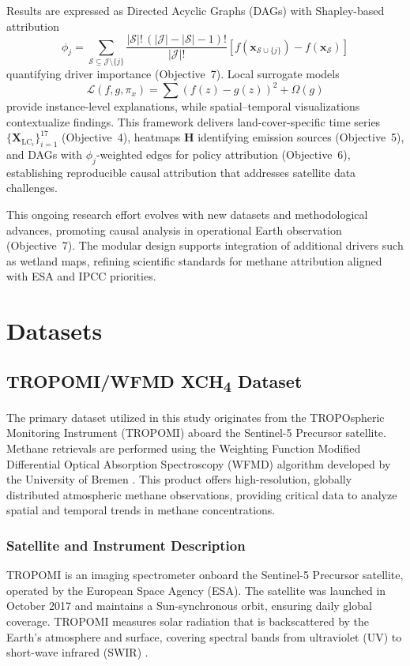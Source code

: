 Results are expressed as Directed Acyclic Graphs (DAGs) with Shapley-based attribution  
\[
\phi_j = \sum_{\mathcal{S} \subseteq \mathcal{J} \setminus \{j\}}
\frac{|\mathcal{S}|! \,(|\mathcal{J}| - |\mathcal{S}| - 1)!}{|\mathcal{J}|!}
\left[ f(\mathbf{x}_{\mathcal{S} \cup \{j\}}) - f(\mathbf{x}_{\mathcal{S}}) \right]
\]  
quantifying driver importance (Objective~7). Local surrogate models  
\[
\mathcal{L}(f,g,\pi_x) = \sum (f(z) - g(z))^2 + \Omega(g)
\]  
provide instance-level explanations, while spatial–temporal visualizations contextualize findings. This framework delivers land-cover-specific time series $\{\mathbf{X}_{\mathrm{LC}_i}\}_{i=1}^{17}$ (Objective~4), heatmaps $\mathbf{H}$ identifying emission sources (Objective~5), and DAGs with $\phi_j$-weighted edges for policy attribution (Objective~6), establishing reproducible causal attribution that addresses satellite data challenges.  

This ongoing research effort evolves with new datasets and methodological advances, promoting causal analysis in operational Earth observation (Objective~7). The modular design supports integration of additional drivers such as wetland maps, refining scientific standards for methane attribution aligned with ESA and IPCC priorities.



\section{Datasets}
\label{sec:datasets}

\subsection{TROPOMI/WFMD \texorpdfstring{XCH\textsubscript{4}}{XCH4} Dataset}

The primary dataset utilized in this study originates from the TROPOspheric Monitoring Instrument (TROPOMI) aboard the Sentinel-5 Precursor satellite. Methane retrievals are performed using the Weighting Function Modified Differential Optical Absorption Spectroscopy (WFMD) algorithm developed by the University of Bremen \cite{Schneising2019, Schneising2023}. This product offers high-resolution, globally distributed atmospheric methane observations, providing critical data to analyze spatial and temporal trends in methane concentrations.

\subsubsection{Satellite and Instrument Description}
TROPOMI is an imaging spectrometer onboard the Sentinel-5 Precursor satellite, operated by the European Space Agency (ESA). The satellite was launched in October 2017 and maintains a Sun-synchronous orbit, ensuring daily global coverage. TROPOMI measures solar radiation that is backscattered by the Earth's atmosphere and surface, covering spectral bands from ultraviolet (UV) to short-wave infrared (SWIR) \cite{Veefkind2012}.

